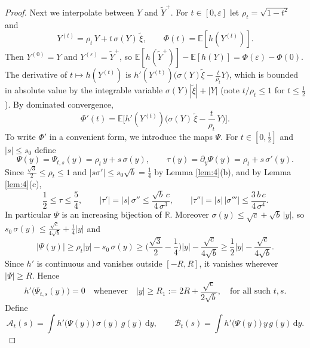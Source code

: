 \documentclass[aip,jmp,preprint,onecolumn,floatfix,superscriptaddress,nofootinbib,11pt]{revtex4-2}
\theoremstyle{plain}
\theoremstyle{remark}
\numberwithin{equation}{section}
\newcommand{\dd}{\mathrm{d}}
\newcommand{\E}{\mathbb{E}}
\newcommand{\eps}{\varepsilon}
\begin{document}
\begin{proof}
Next we interpolate between $Y$ and $\tilde Y^{+}$. For $t\in[0,\eps]$ let $\rho_t=\sqrt{1-t^{2}}$ and
%
\begin{equation*}
Y^{(t)}=\rho_t\,Y+t\,\sigma(Y)\,\tilde\xi,\qquad \Phi(t)=\E[h(Y^{(t)})].
\end{equation*}
%
Then $Y^{(0)}=Y$ and $Y^{(\eps)}=\tilde Y^{+}$, so $\E[h(\tilde Y^{+})]-\E[h(Y)]=\Phi(\eps)-\Phi(0)$. The derivative of $t\mapsto h(Y^{(t)})$ is $h'(Y^{(t)})\big(\sigma(Y)\tilde\xi-\tfrac{t}{\rho_t}Y\big)$, which is bounded in absolute value by the integrable variable $\sigma(Y)|\tilde\xi|+|Y|$ (note $t/\rho_t\le1$ for $t\le\tfrac12$). By dominated convergence,
%
\begin{equation*}
\Phi'(t)=\E\Big[h'(Y^{(t)})\Big(\sigma(Y)\,\tilde\xi-\frac{t}{\rho_t}\,Y\Big)\Big].
\end{equation*}
%
To write $\Phi'$ in a convenient form, we introduce the maps $\Psi$. For $t\in[0,\tfrac12]$ and $|s|\le s_0$ define
%
\begin{equation*}
\Psi(y)=\Psi_{t,s}(y)=\rho_t\,y+s\,\sigma(y),\qquad \tau(y)=\partial_y\Psi(y)=\rho_t+s\,\sigma'(y).
\end{equation*}
%
Since $\tfrac{\sqrt3}{2}\le\rho_t\le1$ and $|s\sigma'|\le s_0\sqrt b=\tfrac14$ by Lemma \ref{lem:4}(b), and by Lemma \ref{lem:4}(c),
%
\begin{equation}
\frac12\le\tau\le\frac54,\qquad |\tau'|=|s|\,\sigma''\le\frac{\sqrt b\,c}{4\,\sigma^{3}},\qquad |\tau''|=|s|\,|\sigma'''|\le\frac{3\,b\,c}{4\,\sigma^{4}} .
\label{eq:4.10}
\end{equation}
%
In particular $\Psi$ is an increasing bijection of $\mathbb R$. Moreover $\sigma(y)\le\sqrt c+\sqrt b\,|y|$, so $s_0\,\sigma(y)\le\tfrac{\sqrt c}{4\sqrt b}+\tfrac14|y|$ and
%
\begin{equation*}
|\Psi(y)|\ge\rho_t|y|-s_0\,\sigma(y)\ge\Big(\frac{\sqrt3}{2}-\frac14\Big)|y|-\frac{\sqrt c}{4\sqrt b}\ge\frac12|y|-\frac{\sqrt c}{4\sqrt b}.
\end{equation*}
%
Since $h'$ is continuous and vanishes outside $[-R,R]$, it vanishes wherever $|\Psi|\ge R$. Hence
%
\begin{equation*}
h'\big(\Psi_{t,s}(y)\big)=0\quad\text{whenever}\quad|y|\ge R_1:=2R+\frac{\sqrt c}{2\sqrt b},\quad\text{for all such }t,s.
\end{equation*}
%
Define
%
\begin{equation*}
\mathcal A_t(s)=\int h'\big(\Psi(y)\big)\,\sigma(y)\,g(y)\,\dd y,\qquad \mathcal B_t(s)=\int h'\big(\Psi(y)\big)\,y\,g(y)\,\dd y .
\end{equation*}

\end{proof}
\end{document}

